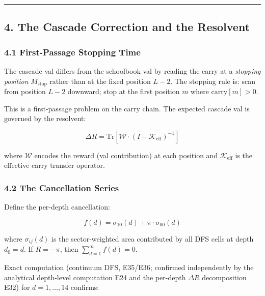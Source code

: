\documentclass[
  11pt,
]{article}
\begin{document}
\begin{center}\rule{0.5\linewidth}{0.5pt}\end{center}

\newpage

\subsection{4. The Cascade Correction and the
Resolvent}\label{the-cascade-correction-and-the-resolvent}

\subsubsection{4.1 First-Passage Stopping
Time}\label{first-passage-stopping-time}

The cascade val differs from the schoolbook val by reading the carry at a
\emph{stopping position} \(M_{\mathrm{stop}}\) rather than at the fixed position
\(L - 2\). The stopping rule is: scan from position \(L - 2\) downward; stop at
the first position \(m\) where \(\mathrm{carry}[m] > 0\).

This is a first-passage problem on the carry chain. The expected cascade val is
governed by the resolvent:

\[\Delta R = \mathrm{Tr}\!\left[\mathcal{W} \cdot (I - \mathcal{K}_{\mathrm{eff}})^{-1}\right]\]

where \(\mathcal{W}\) encodes the reward (val contribution) at each position and
\(\mathcal{K}_{\mathrm{eff}}\) is the effective carry transfer operator.

\subsubsection{4.2 The Cancellation Series}\label{the-cancellation-series}

Define the per-depth cancellation:

\[f(d) = \sigma_{10}(d) + \pi \cdot \sigma_{00}(d)\]

where \(\sigma_{ij}(d)\) is the sector-weighted area contributed by all DFS
cells at depth \(d_0 = d\). If \(R = -\pi\), then
\(\sum_{d=1}^{\infty} f(d) = 0\).

Exact computation (continuum DFS, E35/E36; confirmed independently by the
analytical depth-level computation E24 and the per-depth \(\Delta R\)
decomposition E32) for \(d = 1, \ldots, 14\) confirms:
\end{document}
